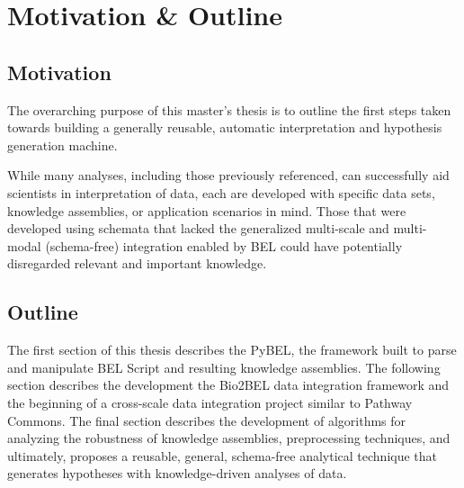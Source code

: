 \chapter{Motivation \& Outline}
\label{ch:motivation_goal}

\section{Motivation}

The overarching purpose of this master's thesis is to outline the first steps taken towards building a generally reusable, automatic interpretation and hypothesis generation machine.

While many analyses, including those previously referenced, can successfully aid scientists in interpretation of data, each are developed with specific data sets, knowledge assemblies, or application scenarios in mind. Those that were developed using schemata that lacked the generalized multi-scale and multi-modal (schema-free) integration enabled by BEL could have potentially disregarded relevant and important knowledge. 

\section{Outline}

The first section of this thesis describes the PyBEL, the framework built to parse and manipulate BEL Script and resulting knowledge assemblies. The following section describes the development the Bio2BEL data integration framework and the beginning of a cross-scale data integration project similar to Pathway Commons. The final section describes the development of algorithms for analyzing the robustness of knowledge assemblies, preprocessing techniques, and ultimately, proposes a reusable, general, schema-free analytical technique that generates hypotheses with knowledge-driven analyses of data.
